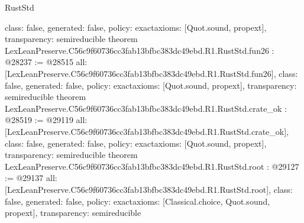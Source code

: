 \begin{lexlean}{RustStd}
\begin{coremodule}
{  class: false,
  generated: false,
  policy: exact{axioms: [Quot.sound, propext]},
  transparency: semireducible
}
theorem LexLeanPreserve.C56c9f60736cc3fab13bfbc383dc49ebd.R1.RustStd.fun26 : @28237 := @28515 {
  all: [LexLeanPreserve.C56c9f60736cc3fab13bfbc383dc49ebd.R1.RustStd.fun26],
  class: false,
  generated: false,
  policy: exact{axioms: [Quot.sound, propext]},
  transparency: semireducible
}
theorem LexLeanPreserve.C56c9f60736cc3fab13bfbc383dc49ebd.R1.RustStd.crate_ok : @28519 := @29119 {
  all: [LexLeanPreserve.C56c9f60736cc3fab13bfbc383dc49ebd.R1.RustStd.crate_ok],
  class: false,
  generated: false,
  policy: exact{axioms: [Quot.sound, propext]},
  transparency: semireducible
}
theorem LexLeanPreserve.C56c9f60736cc3fab13bfbc383dc49ebd.R1.RustStd.root : @29127 := @29137 {
  all: [LexLeanPreserve.C56c9f60736cc3fab13bfbc383dc49ebd.R1.RustStd.root],
  class: false,
  generated: false,
  policy: exact{axioms: [Classical.choice, Quot.sound, propext]},
  transparency: semireducible
}


\end{coremodule}
\end{lexlean}
